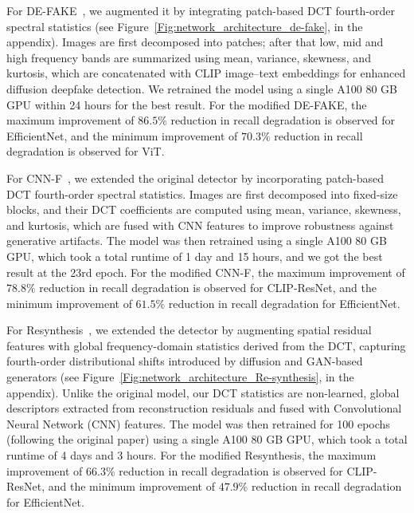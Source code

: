 \documentclass[letterpaper,twocolumn,10pt]{article}
\begin{document}
For DE-FAKE~\cite{Sha2023DE-FAKE}, we augmented it by integrating patch-based DCT fourth-order spectral statistics (see Figure~\ref{Fig:network_architecture_de-fake}, in the appendix). Images are first decomposed into patches; after that low, mid and high frequency bands are summarized using mean, variance, skewness, and kurtosis, which are concatenated with CLIP image–text embeddings for enhanced diffusion deepfake detection. We retrained the model using a single A100 80 GB GPU within 24 hours for the best result. For the modified DE-FAKE, the maximum improvement of $86.5\%$ reduction in recall degradation is observed for EfficientNet, and the minimum improvement of $70.3\%$ reduction in recall degradation is observed for ViT. 


For CNN-F~\cite{Wang2024cnngenerated}, we extended the original detector by incorporating patch-based DCT fourth-order spectral statistics. Images are first decomposed into fixed-size blocks, and their DCT coefficients are computed using mean, variance, skewness, and kurtosis, which are fused with CNN features to improve robustness against generative artifacts. The model was then retrained using a single A100 80 GB GPU, which took a total runtime of 1 day and 15 hours, and we got the best result at the 23rd epoch. For the modified CNN-F, the maximum improvement of $78.8\%$ reduction in recall degradation is observed for CLIP-ResNet, and the minimum improvement of $61.5\%$ reduction in recall degradation for EfficientNet. 

For Resynthesis~\cite{he2021Resynthesis}, we extended the detector by augmenting spatial residual features with global frequency-domain statistics derived from the DCT, capturing fourth-order distributional shifts introduced by diffusion and GAN-based generators (see Figure~\ref{Fig:network_architecture_Re-synthesis}, in the appendix).
Unlike the original model, our DCT statistics are non-learned, global descriptors extracted from reconstruction residuals and fused with Convolutional Neural Network (CNN) features. The model was then retrained for 100 epochs (following the original paper) using a single A100 80 GB GPU, which took a total runtime of 4 days and 3 hours. 
For the modified Resynthesis, the maximum improvement of $66.3\%$ reduction in recall degradation is observed for CLIP-ResNet, and the minimum improvement of $47.9\%$ reduction in recall degradation for EfficientNet. 
\end{document}
